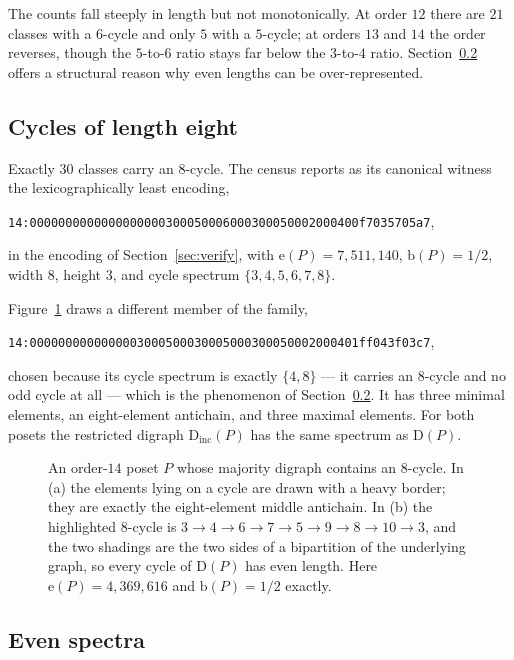 \documentclass[11pt]{article}
\theoremstyle{definition}
\newcommand{\ext}{\mathrm{e}}
\newcommand{\bal}{\mathrm{b}}
\newcommand{\Dig}{\mathrm{D}}
\newcommand{\CEIGHT}{30}
\begin{document}
The counts fall steeply in length but not monotonically.  At order $12$ there
are $21$ classes with a $6$-cycle and only $5$ with a $5$-cycle; at orders
$13$ and $14$ the order reverses, though the $5$-to-$6$ ratio stays far below
the $3$-to-$4$ ratio.  Section~\ref{sec:even} offers a structural reason why
even lengths can be over-represented.

\subsection{Cycles of length eight}

Exactly $\CEIGHT$ classes carry an $8$-cycle.  The census reports as its
canonical witness the lexicographically least encoding,
\begin{center}
\texttt{14:0000000000000000000300050006000300050002000400f7035705a7},
\end{center}
in the encoding of Section~\ref{sec:verify}, with $\ext(P)=7{,}511{,}140$,
$\bal(P)=1/2$, width $8$, height $3$, and cycle spectrum $\{3,4,5,6,7,8\}$.

Figure~\ref{fig:cycle8} draws a different member of the family,
\begin{center}
\texttt{14:0000000000000003000500030005000300050002000401ff043f03c7},
\end{center}
chosen because its cycle spectrum is exactly $\{4,8\}$ --- it carries an
$8$-cycle and no odd cycle at all --- which is the phenomenon of
Section~\ref{sec:even}.  It has three minimal elements, an eight-element
antichain, and three maximal elements.  For both posets the restricted digraph
$\Dig_{\mathrm{inc}}(P)$ has the same spectrum as $\Dig(P)$.

\begin{figure}[ht]
\centering

\caption{An order-$14$ poset $P$ whose majority digraph contains an $8$-cycle.
In (a) the elements lying on a cycle are drawn with a heavy border; they are
exactly the eight-element middle antichain.  In (b) the highlighted $8$-cycle
is $3\to4\to6\to7\to5\to9\to8\to10\to3$, and the two shadings are the two
sides of a bipartition of the underlying graph, so every cycle of $\Dig(P)$
has even length.  Here $\ext(P)=4{,}369{,}616$ and $\bal(P)=1/2$ exactly.}
\label{fig:cycle8}
\end{figure}

\subsection{Even spectra}\label{sec:even}
\end{document}
